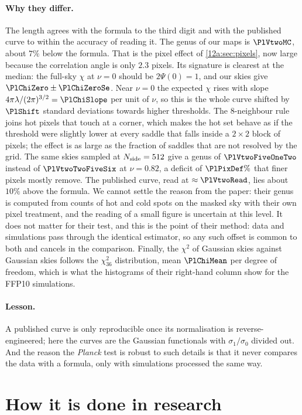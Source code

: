 \paragraph{Why they differ.} The length agrees with the formula to the third digit and with the published curve
to within the accuracy of reading it. The genus of our maps is $\PlVtwoMC$, about $7\%$ below the formula. That is
the pixel effect of \cref{12a:sec:pixels}, now large because the correlation angle is only $2.3$ pixels. Its
signature is clearest at the median: the full-sky $\chi$ at $\nu=0$ should be $2\Psi(0)=1$, and our skies give
$\PlChiZero\pm\PlChiZeroSe$. Near $\nu=0$ the expected $\chi$ rises with slope $4\pi\lambda/(2\pi)^{3/2}=\PlChiSlope$ per
unit of $\nu$, so this is the whole curve shifted by $\PlShift$ standard deviations towards higher thresholds. The
8-neighbour rule joins hot pixels that touch at a corner, which makes the hot set behave as if the threshold were
slightly lower at every saddle that falls inside a $2\times2$ block of pixels; the effect is as large as the fraction
of saddles that are not resolved by the grid. The same skies sampled at $N_{\rm side}=512$ give a genus of
$\PlVtwoFiveOneTwo$ instead of $\PlVtwoTwoFiveSix$ at $\nu=0.82$, a deficit of $\PlPixDef\%$ that finer pixels mostly
remove. The published curve, read at $\approx\PlVtwoRead$, lies about $10\%$ above the formula.
We cannot settle the reason from the paper: their genus is computed from counts of hot and cold spots on the
masked sky with their own pixel treatment, and the reading of a small figure is uncertain at this level. It does not
matter for their test, and this is the point of their method: data and simulations pass through the identical
estimator, so any such offset is common to both and cancels in the comparison. Finally, the $\chi^2$ of Gaussian skies
against Gaussian skies follows the $\chi^2_{36}$ distribution, mean $\PlChiMean$ per degree of freedom, which is what the
histograms of their right-hand column show for the FFP10 simulations.

\paragraph{Lesson.} A published curve is only reproducible once its normalisation is reverse-engineered; here the
curves are the Gaussian functionals with $\sigma_1/\sigma_0$ divided out. And the reason the \textit{Planck} test is
robust to such details is that it never compares the data with a formula, only with simulations processed the same
way.
\section{How it is done in research}
\label{12a:sec:research}

